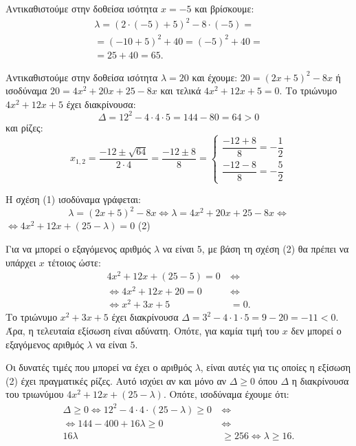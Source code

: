 
\begin{alist}
\item Αντικαθιστούμε στην δοθείσα ισότητα $x = -5$ και βρίσκουμε:
\begin{gather*}
\lambda = (2 \cdot (-5) + 5)^2 - 8 \cdot (-5) = \\
= (-10 + 5)^2 + 40 = (-5)^2 + 40 = \\
= 25 + 40 = 65.
\end{gather*}

\item Αντικαθιστούμε στην δοθείσα ισότητα $\lambda = 20$ και έχουμε:
$20 = (2x + 5)^2 - 8x$
ή ισοδύναμα
$20 = 4x^2 + 20x + 25 - 8x$
και τελικά
$4x^2 + 12x + 5 = 0$.
Το τριώνυμο $4x^2 + 12x + 5$ έχει διακρίνουσα:
\[\Delta = 12^2 - 4 \cdot 4 \cdot 5 = 144 - 80 = 64 > 0\]
και ρίζες:
\[x_{1,2} = \dfrac{-12 \pm \sqrt{64}}{2 \cdot 4} = \dfrac{-12 \pm 8}{8} = \begin{cases} \dfrac{-12 + 8}{8} = -\dfrac{1}{2} \\ \dfrac{-12 - 8}{8} = -\dfrac{5}{2} \end{cases}\]

\item 
\begin{rlist}
\item Η σχέση (1) ισοδύναμα γράφεται:
\[\lambda = (2x + 5)^2 - 8x \Leftrightarrow \lambda = 4x^2 + 20x + 25 - 8x \Leftrightarrow\]
$\Leftrightarrow 4x^2 + 12x + (25 - \lambda) = 0$ (2)

\item Για να μπορεί ο εξαγόμενος αριθμός $\lambda$ να είναι $5$, με βάση τη σχέση (2) θα πρέπει να
υπάρχει $x$ τέτοιος ώστε:
\begin{align*}
4x^2 + 12x + (25 - 5) = 0 \ &\Leftrightarrow \\
\Leftrightarrow 4x^2 + 12x + 20 = 0 \ &\Leftrightarrow \\
\Leftrightarrow x^2 + 3x + 5 &= 0.
\end{align*}
Το τριώνυμο $x^2 + 3x + 5$ έχει διακρίνουσα $\Delta = 3^2 - 4 \cdot 1 \cdot 5 = 9 - 20 = -11 < 0$.
Άρα, η τελευταία εξίσωση είναι αδύνατη. Οπότε, για καμία τιμή του $x$ δεν μπορεί ο
εξαγόμενος αριθμός $\lambda$ να είναι $5$.

\item Οι δυνατές τιμές που μπορεί να έχει ο αριθμός $\lambda$, είναι αυτές για τις οποίες η
εξίσωση (2) έχει πραγματικές ρίζες. Αυτό ισχύει αν και μόνο αν $\Delta \ge 0$ όπου $\Delta$ η
διακρίνουσα του τριωνύμου $4x^2 + 12x + (25 - \lambda)$. Οπότε, ισοδύναμα έχουμε ότι:
\begin{align*}
\Delta \ge 0 \Leftrightarrow 12^2 - 4 \cdot 4 \cdot (25 - \lambda) \ge 0 \ &\Leftrightarrow \\
\Leftrightarrow 144 - 400 + 16\lambda \ge 0 \ &\Leftrightarrow \\
16\lambda &\ge 256 \Leftrightarrow \lambda \ge 16.
\end{align*}
\end{rlist}
\end{alist}


